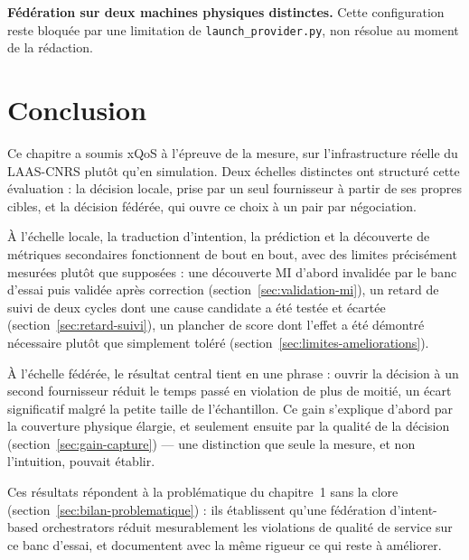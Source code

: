 \textbf{Fédération sur deux machines physiques distinctes.} Cette configuration reste bloquée par une limitation de \texttt{launch\_provider.py}, non résolue au moment de la rédaction.

\newpage
\section{Conclusion}
\label{sec:tests-conclusion}

Ce chapitre a soumis xQoS à l'épreuve de la mesure, sur l'infrastructure réelle du LAAS-CNRS plutôt qu'en simulation. Deux échelles distinctes ont structuré cette évaluation : la décision locale, prise par un seul fournisseur à partir de ses propres cibles, et la décision fédérée, qui ouvre ce choix à un pair par négociation.

À l'échelle locale, la traduction d'intention, la prédiction et la découverte de métriques secondaires fonctionnent de bout en bout, avec des limites précisément mesurées plutôt que supposées : une découverte MI d'abord invalidée par le banc d'essai puis validée après correction (section~\ref{sec:validation-mi}), un retard de suivi de deux cycles dont une cause candidate a été testée et écartée (section~\ref{sec:retard-suivi}), un plancher de score dont l'effet a été démontré nécessaire plutôt que simplement toléré (section~\ref{sec:limites-ameliorations}).

À l'échelle fédérée, le résultat central tient en une phrase : ouvrir la décision à un second fournisseur réduit le temps passé en violation de plus de moitié, un écart significatif malgré la petite taille de l'échantillon. Ce gain s'explique d'abord par la couverture physique élargie, et seulement ensuite par la qualité de la décision (section~\ref{sec:gain-capture}) — une distinction que seule la mesure, et non l'intuition, pouvait établir.

Ces résultats répondent à la problématique du chapitre~1 sans la clore (section~\ref{sec:bilan-problematique}) : ils établissent qu'une fédération d'intent-based orchestrators réduit mesurablement les violations de qualité de service sur ce banc d'essai, et documentent avec la même rigueur ce qui reste à améliorer.

